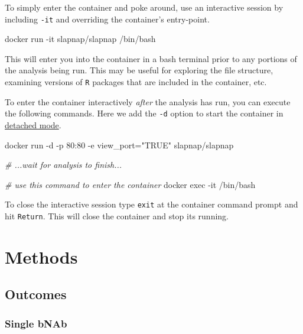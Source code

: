 \documentclass[]{article}
\newenvironment{Shaded}{\begin{snugshade}}{\end{snugshade}}
\newcommand{\StringTok}[1]{\textcolor[rgb]{0.31,0.60,0.02}{#1}}
\newcommand{\CommentTok}[1]{\textcolor[rgb]{0.56,0.35,0.01}{\textit{#1}}}
\newcommand{\ExtensionTok}[1]{#1}
\newcommand{\NormalTok}[1]{#1}
\begin{document}
To simply enter the container and poke around, use an interactive
session by including \texttt{-it} and overriding the container's
entry-point.

\begin{Shaded}
\begin{Highlighting}[]
\ExtensionTok{docker}\NormalTok{ run -it slapnap/slapnap /bin/bash}
\end{Highlighting}
\end{Shaded}

This will enter you into the container in a bash terminal prior to any
portions of the analysis being run. This may be useful for exploring the
file structure, examining versions of \texttt{R} packages that are
included in the container, etc.

To enter the container interactively \emph{after} the analysis has run,
you can execute the following commands. Here we add the \texttt{-d}
option to start the container in
\href{https://docs.docker.com/engine/reference/run/\#detached--d}{detached
mode}.

\begin{Shaded}
\begin{Highlighting}[]
\ExtensionTok{docker}\NormalTok{ run -d -p 80:80 -e view_port=}\StringTok{"TRUE"}\NormalTok{ slapnap/slapnap}

\CommentTok{# ...wait for analysis to finish...}

\CommentTok{# use this command to enter the container}
\ExtensionTok{docker}\NormalTok{ exec -it /bin/bash}
\end{Highlighting}
\end{Shaded}

To close the interactive session type \texttt{exit} at the container
command prompt and hit \texttt{Return}. This will close the container
and stop its running.

\section{Methods}\label{sec:methods}

\subsection{Outcomes}\label{sec:outcomedefs}

\subsubsection{Single bNAb}\label{single-bnab}
\end{document}
